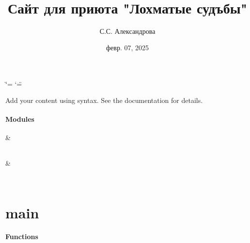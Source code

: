 \documentclass[letterpaper,10pt,russian]{sphinxmanual}
\title{Сайт для приюта "Лохматые судъбы"}
\date{февр. 07, 2025}
\author{С.С.\@{} Александрова}
\begin{document}
\ifdefined\shorthandoff
  \ifnum\catcode`\=\string=\active\shorthandoff{=}\fi
  \ifnum\catcode`\"=\active{}\fi
\fi

\pagestyle{empty}
\sphinxmaketitle
\pagestyle{plain}
\sphinxtableofcontents
\pagestyle{normal}
\label{\detokenize{index::doc}}


\sphinxAtStartPar
Add your content using  syntax. See the
documentation for details.
\subsubsection*{Modules}


\begin{savenotes}\sphinxattablestart
\sphinxthistablewithglobalstyle
\sphinxthistablewithnovlinesstyle
\centering
\begin{tabulary}{\linewidth}[t]{}
\sphinxtoprule
\sphinxtableatstartofbodyhook
\sphinxAtStartPar
{\hyperref[\detokenize{generated/main:module-main}]{}}
&
\sphinxAtStartPar

\\
\sphinxhline
\sphinxAtStartPar
{\hyperref[\detokenize{generated/instance.convertor:module-instance.convertor}]{}}
&
\sphinxAtStartPar

\\
\sphinxbottomrule
\end{tabulary}
\sphinxtableafterendhook\par
\sphinxattableend\end{savenotes}

\sphinxstepscope


\chapter{main}
\label{\detokenize{generated/main:module-main}}\label{\detokenize{generated/main:main}}\label{\detokenize{generated/main::doc}}\subsubsection*{Functions}
\end{document}
